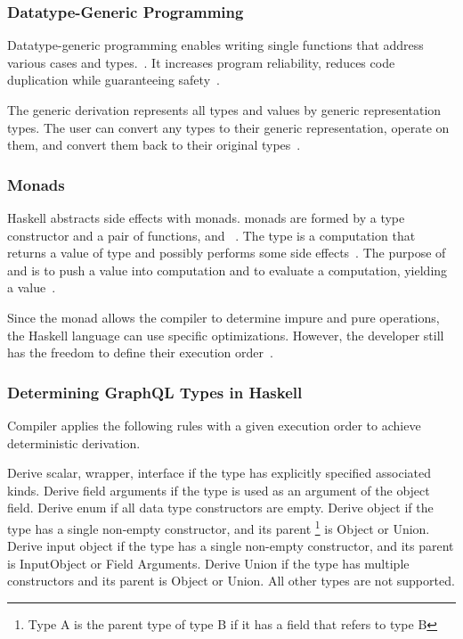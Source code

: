 \begin{frame}\frametitle{Datatype-Generic Programming}
    
  Datatype-generic programming enables writing single functions that address various cases and types.~\cite{derivable-type-classes}. 
  It increases program reliability, reduces code duplication while guaranteeing safety~\cite{datatype-generic-programming,optimizing-generics}.
  
      
  The generic derivation represents all types and values by generic representation types. The user can convert any types to their generic representation, operate on them, and convert them back to their original types~\cite{optimizing-generics, ghc-generics}.
  
  \end{frame}

\begin{frame}\frametitle{Monads}

Haskell abstracts side effects with monads. monads are formed by a type constructor  and a pair of functions,  and \expr{>>=}~\cite{history-of-haskell,essence-of-fp}. The type  is a computation that returns a value of type  and possibly performs some side effects~\cite{history-of-haskell}. The purpose of  and \expr{>>=} is to push a value into computation and to evaluate a computation, yielding a value~\cite{essence-of-fp}.

Since the monad allows the compiler to determine impure and pure operations, the Haskell language can use specific optimizations. However, the developer still has the freedom to define their execution order~\cite{history-of-haskell}.

\end{frame}

\begin{frame}\frametitle{Determining GraphQL Types in Haskell}
Compiler applies the following rules with a given execution order to achieve deterministic derivation.
\begin{enumerate}
   Derive scalar, wrapper, interface if the type has explicitly specified associated kinds. 
   Derive field arguments if the type is used as an argument of the object field. 
   Derive enum if all data type constructors are empty.
   Derive object if the type has a single non-empty constructor, and its parent \footnote{Type A is the parent type of type B if it has a field that refers to type B} is Object or Union. 
   Derive input object if the type has a single non-empty constructor, and its parent is InputObject or Field Arguments.
   Derive Union if the type has multiple constructors and its parent is Object or Union.
   All other types are not supported.
\end{enumerate}
\end{frame}
